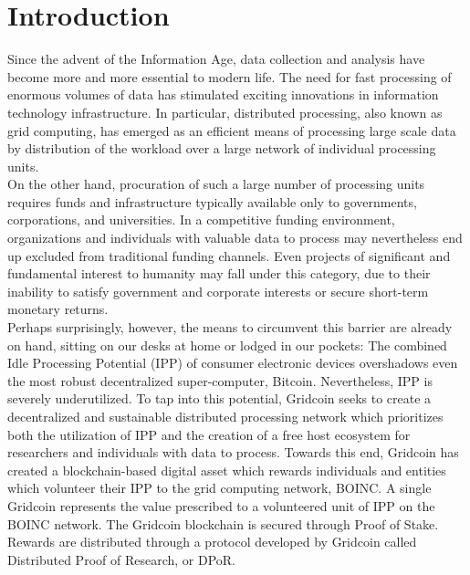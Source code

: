 \section{Introduction}

\label{sec:intro}

Since the advent of the Information Age, data collection and analysis have become more and more essential to modern life. The need for fast processing of enormous volumes of data has stimulated exciting innovations in information technology infrastructure. In particular, distributed processing, also known as grid computing, has emerged as an efficient means of processing large scale data by distribution of the workload over a large network of individual processing units.\\ 

On the other hand, procuration of such a large number of processing units requires funds and infrastructure typically available only to governments, corporations, and universities. In a competitive funding environment, organizations and individuals with valuable data to process may nevertheless end up excluded from traditional funding channels. Even projects of significant and fundamental interest to humanity may fall under this category, due to their inability to satisfy government and corporate interests or secure short-term monetary returns. \\

Perhaps surprisingly, however, the means to circumvent this barrier are already on hand, sitting on our desks at home or lodged in our pockets: The combined Idle Processing Potential (IPP) of consumer electronic devices overshadows even the most robust decentralized super-computer, Bitcoin. Nevertheless, IPP is severely underutilized. To tap into this potential, Gridcoin seeks to create a decentralized and sustainable distributed processing network which prioritizes both the utilization of IPP and the creation of a free host ecosystem for researchers and individuals with data to process. Towards this end, Gridcoin has created a blockchain-based digital asset which rewards individuals and entities which volunteer their IPP to the grid computing network, BOINC.  A single Gridcoin represents the value prescribed to a volunteered unit of IPP on the BOINC network.  The Gridcoin blockchain is secured through Proof of Stake.  Rewards are distributed through a protocol developed by Gridcoin called Distributed Proof of Research, or DPoR.\\

